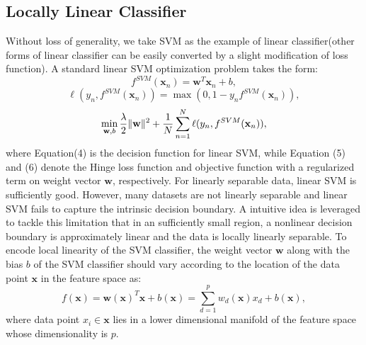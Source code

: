 \documentclass{llncs}
\DeclarePairedDelimiter\norm{\lVert}{\rVert}
\def \x {\mathbf{x}}
\def \w {\mathbf{w}}
\begin{document}
	\subsection{Locally Linear Classifier}
	Without loss of generality, we take SVM as the example of linear classifier(other forms of linear classifier can be easily converted by a slight modification of loss function). A standard linear SVM optimization problem takes the form:
	\begin{equation}
	f^{SVM}(\x_n) = \w^T\x_n + b,
	\end{equation}	
	\begin{equation}
	\ell(y_n,f^{SVM}(\x_n))=\max(0,1-y_nf^{SVM}(\x_n)),
	\end{equation}
	\begin{equation}
	\min_{\w,b} \frac{\lambda}{2}\norm{\w}^2 + \frac{1}{N}\sum_{n=1}^{N}\ell(y_n,f^{SVM}(\x_n)),
	\end{equation}
	where Equation(4) is the decision function for linear SVM, while Equation (5) and (6) denote the Hinge loss function and objective function with a regularized term on weight vector $\w$, respectively. For linearly separable data, linear SVM is sufficiently good. However, many datasets are not linearly separable and linear SVM fails to capture the intrinsic decision boundary. A intuitive idea is leveraged to tackle this limitation that in an sufficiently small region, a nonlinear decision boundary is approximately linear and the data is locally linearly separable. To encode local linearity of the SVM classifier, the weight vector $\w$ along with the bias $b$ of the SVM classifier should vary according to the location of the data point $\x$ in the feature space as:
	\begin{equation}
	f(\x) = \w(\x)^T\x + b(\x) = \sum_{d=1}^{p}w_d(\x)x_d+b(\x),
	\end{equation}
	where data point $x_i \in \x$ lies in a lower dimensional manifold of the feature space whose dimensionality is $p$.
	
\end{document}
